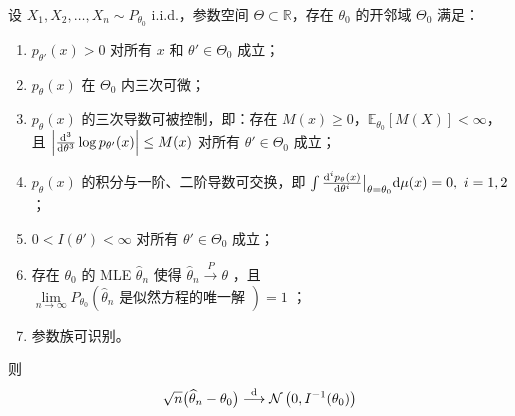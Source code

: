 \begin{theorem}\label{thm:ch7:mle-asymptotic-normality}

设 $X_1,X_2,\dots,X_n \sim P_{\theta_0}$ i.i.d.，参数空间 $\Theta \subset \mathbb{R}$，存在 $\theta_0$ 的开邻域 $\Theta_0$ 满足：

\begin{enumerate}
\def\labelenumi{\arabic{enumi}.}
\tightlist
\item
  $p_{\theta'}(x) > 0$ 对所有 $x$ 和 $\theta' \in \Theta_0$ 成立；
\item
  $p_\theta(x)$ 在 $\Theta_0$ 内三次可微；
\item
  $p_\theta(x)$ 的三次导数可被控制，即：存在 $M(x) \ge 0$，$\mathbb{E}_{\theta_0}[M(X)] < \infty$，且 $\left|\frac{{\rm d}^3}{{\rm d}\theta^3} \log p_{\theta'}(x)\right| \le M(x)$ 对所有 $\theta' \in \Theta_0$ 成立；
\item
  $p_\theta(x)$ 的积分与一阶、二阶导数可交换，即 $\int \frac{{\rm d}^ip_\theta(x)}{{\rm d}\theta^i} \big|_{\theta=\theta_0} \mathrm{d}\mu(x)=0,\  i=1,2$；
\item
  $0 < I(\theta') < \infty$ 对所有 $\theta' \in \Theta_0$ 成立；
\item
  存在 $\theta_0$ 的 MLE $\widehat\theta_n$ 使得 $\widehat\theta_n\overset P\to \theta$ ，且 $\lim\limits_{n\to\infty}P_{\theta_0}\left(\widehat\theta_n\text{ 是似然方程的唯一解 }\right)=1$ ；
\item
  参数族可识别。
\end{enumerate}

则 \[\sqrt{n} \big(\widehat{\theta}_n - \theta_0\big) \overset{\rm d}\longrightarrow \mathcal{N}\left(0, I^{-1}(\theta_0)\right)\]
\end{theorem}

